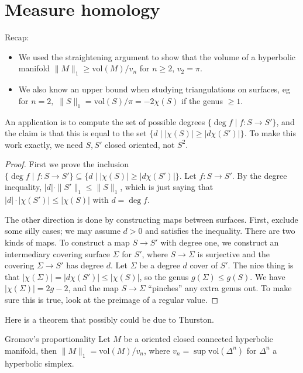 \section{Measure homology} 
Recap:
\begin{itemize}
\setlength\itemsep{-.2em}
    \item We used the straightening argument to show that the volume of a hyperbolic manifold $\| M\|_1 \geq \mathrm{vol} (M) / v_n $ for $n \geq 2$, $v_2 =\pi$.
    \item We also know an upper bound when studying triangulations on surfaces, eg for $n=2,$ $\|S\|_1= \mathrm{vol}(S) / \pi=-2 \chi(S)$ if the genus $\geq 1$.
\end{itemize}
An application is to compute the set of possible degrees $\{ \deg f \mid  f \colon S \to S'\} $, and the claim is that this is equal to the set $\{d \mid |\chi(S)| \geq |d \chi(S')|\} $. To make this work exactly, we need $S,S'$ closed oriented, not $S^2$.
\begin{proof}
    First we prove the inclusion $\{ \deg f \mid  f \colon S \to S'\} \subseteq  \{d \mid |\chi(S)| \geq |d \chi(S')|\} $. Let $f \colon S \to S'$. By the degree inequality, $|d| \cdot  \|S'\|_1 \leq \|S\|_1$, which is just saying that $|d| \cdot  |\chi(S')| \leq |\chi(S)|$ with $d=\deg f$.

    The other direction is done by constructing maps between surfaces. First, exclude some silly cases; we may assume $d>0$ and satisfies the inequality. There are two kinds of maps. To construct a map $S \to S'$ with degree one, we construct an intermediary covering surface $\Sigma$ for $S'$, where $S\to \Sigma$ is surjective and the covering $\Sigma \to S'$ has degree $d$. Let $\Sigma$ be a degree  $d$ cover of $S'$. The nice thing is that $|\chi(\Sigma)|=|d\chi(S')| \leq |\chi(S)|$, so the genus $g(\Sigma) \leq g(S)$. We have $|\chi(\Sigma)| = 2g-2$, and the map  $S \to \Sigma$ ``pinches'' any extra genus out. To make sure this is true, look at the preimage of a regular value.
\end{proof}
Here is a theorem that possibly could be due to Thurston.
\begin{namedthm}{Gromov's proportionality} 
    Let $M$ be a oriented closed connected hyperbolic manifold, then $\|M\|_1= \mathrm{vol}(M) / v_n$, where $v_n = \sup \mathrm{vol}(\Delta ^n )$ for $\Delta ^n $ a hyperbolic simplex.
\end{namedthm}
